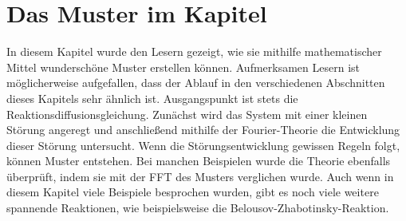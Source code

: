 %
%
%
%




\section{Das Muster im Kapitel}

In diesem Kapitel wurde den Lesern gezeigt, wie sie mithilfe mathematischer Mittel wunderschöne Muster erstellen können.
Aufmerksamen Lesern ist möglicherweise aufgefallen, dass der Ablauf in den verschiedenen Abschnitten dieses Kapitels sehr ähnlich ist.
Ausgangspunkt ist stets die Reaktionsdiffusionsgleichung.
Zunächst wird das System mit einer kleinen Störung angeregt und anschließend mithilfe der Fourier-Theorie die Entwicklung dieser Störung untersucht.
Wenn die Störungsentwicklung gewissen Regeln folgt, können Muster entstehen.
Bei manchen Beispielen wurde die Theorie ebenfalls überprüft, indem sie mit der FFT des Musters verglichen wurde.
Auch wenn in diesem Kapitel viele Beispiele besprochen wurden, gibt es noch viele weitere spannende Reaktionen, wie beispielsweise die Belousov-Zhabotinsky-Reaktion.
